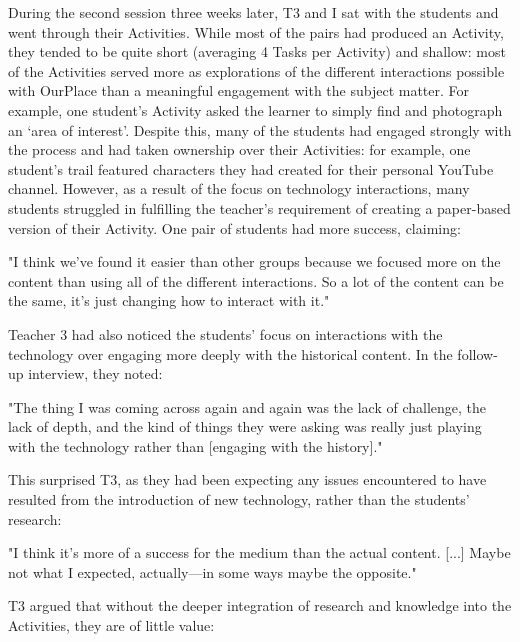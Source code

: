 During the second session three weeks later, T3 and I sat with the students and went through their Activities. While most of the pairs had produced an Activity, they tended to be quite short (averaging 4 Tasks per Activity) and shallow: most of the Activities served more as explorations of the different interactions possible with OurPlace than a meaningful engagement with the subject matter. For example, one student's Activity asked the learner to simply find and photograph an `area of interest'. Despite this, many of the students had engaged strongly with the process and had taken ownership over their Activities: for example, one student's trail featured characters they had created for their personal YouTube channel. However, as a result of the focus on technology interactions, many students struggled in fulfilling the teacher's requirement of creating a paper-based version of their Activity. One pair of students had more success, claiming:

\begin{displayquote}
"I think we've found it easier than other groups because we focused more on the content than using all of the different interactions. So a lot of the content can be the same, it's just changing how to interact with it."
\end{displayquote}

Teacher 3 had also noticed the students' focus on interactions with the technology over engaging more deeply with the historical content. In the follow-up interview, they noted: 

\begin{displayquote}
"The thing I was coming across again and again was the lack of challenge, the lack of depth, and the kind of things they were asking was really just playing with the technology rather than [engaging with the history]."
\end{displayquote}

This surprised T3, as they had been expecting any issues encountered to have resulted from the introduction of new technology, rather than the students' research: 

\begin{displayquote}
"I think it's more of a success for the medium than the actual content. [...] Maybe not what I expected, actually---in some ways maybe the opposite."
\end{displayquote}

T3 argued that without the deeper integration of research and knowledge into the Activities, they are of little value: 

